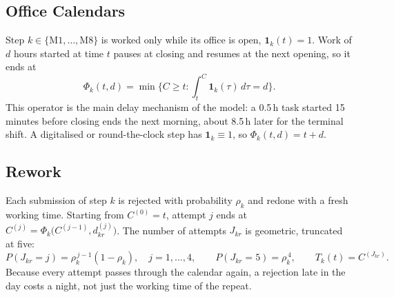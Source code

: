 \subsection{Office Calendars}
Step $k \in \{\mathrm{M1},\dots,\mathrm{M8}\}$ is worked only while its office is open, $\mathbf{1}_k(t) = 1$. Work of $d$ hours started at time $t$ pauses at closing and resumes at the next opening, so it ends at
\begin{equation}
\Phi_k(t, d) = \min\Big\{ C \ge t : \int_t^{C} \mathbf{1}_k(\tau)\, d\tau = d \Big\}.
\label{eq:cal}
\end{equation}
This operator is the main delay mechanism of the model: a 0.5\,h task started 15 minutes before closing ends the next morning, about 8.5\,h later for the terminal shift. A digitalised or round-the-clock step has $\mathbf{1}_k \equiv 1$, so $\Phi_k(t,d) = t + d$.

\subsection{Rework}
Each submission of step $k$ is rejected with probability $\rho_k$ and redone with a fresh working time. Starting from $C^{(0)} = t$, attempt $j$ ends at $C^{(j)} = \Phi_k\big(C^{(j-1)}, d^{(j)}_{kr}\big)$. The number of attempts $J_{kr}$ is geometric, truncated at five:
\begin{equation}
P(J_{kr} = j) = \rho_k^{\,j-1}(1-\rho_k), \quad j = 1,\dots,4, \qquad P(J_{kr} = 5) = \rho_k^{\,4}, \qquad T_k(t) = C^{(J_{kr})} .
\label{eq:rework}
\end{equation}
Because every attempt passes through the calendar again, a rejection late in the day costs a night, not just the working time of the repeat.

